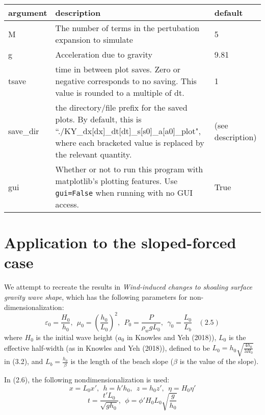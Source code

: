 \documentclass[10pt,a4paper]{article}
\newenvironment{optarglist}
    {\begin{center}
    \begin{tabular}{l|p{10cm}|l}
    argument & description & default\\
    \hline
    }
    { 
    \end{tabular} 
    \end{center}
    }
\begin{document}
\begin{optarglist}
    M           &
           The number of terms in the pertubation expansion to simulate& 5\\\hline

    g              &
           Acceleration due to gravity&9.81 \\\hline

    tsave    & 
           time in between plot saves. Zero or negative corresponds to no
            saving. This value is rounded to a multiple of dt.& 1\\\hline
    
    save\_dir     &  
           the directory/file prefix for the saved plots. By default, this is ``./KY\_dx[dx]\_dt[dt]\_s[s0]\_a[a0]\_plot", where each
bracketed value is replaced by the relevant quantity. & (see description)\\\hline

 gui &
Whether or not to run this program with matplotlib's plotting features. Use \texttt{gui=False} when running with no GUI access. & True
\end{optarglist}
\pagebreak



\section{Application to the sloped-forced case}

We attempt to recreate the results in \emph{Wind-induced changes to shoaling surface gravity wave shape}, which has the following parameters for non-dimensionalization:
$$\varepsilon_0 = \frac{H_0}{h_0},~~ \mu_0 = \left(\frac{h_0}{L_0}\right)^2, ~~P_0 = \frac{P}{\rho_w g L_0},~~ \gamma_0 = \frac{L_0}{L_b}~~~~(2.5)$$
where $H_0$ is the initial wave height ($a_0$ in Knowles and Yeh (2018)), $L_0$ is the effective half-width (as in Knowles and Yeh (2018)), defined to be $L_0 = h_0\sqrt{\frac{4h_0}{3H_0}}$ in (3.2), and $L_b = \frac{h_0}{\beta}$ is the length of the beach slope ($\beta$ is the value of the slope).

In (2.6), the following nondimensionalization is used:
$$x = L_0x',~~h = h'h_0,~~z=h_0z',~~\eta = H_0\eta'$$
$$t = \frac{t'L_0}{\sqrt{gh_0}},~~\phi = \phi' H_0 L_0 \sqrt{\frac{g}{h_0}}$$
\end{document}
